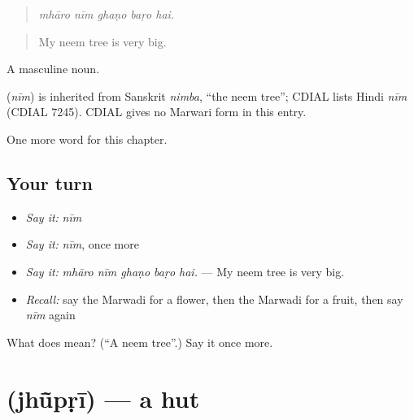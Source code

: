 \begin{quote}
    
\end{quote}

\begin{quote}
\emph{mhāro nīm ghaṇo baṛo hai.}
\end{quote}

\begin{quote}
My neem tree is very big.
\end{quote}

A masculine noun.

\begin{cousinweb}
\textbf{} (\emph{nīm}) is inherited from Sanskrit \emph{nimba}, \textquotedblleft{}the neem tree\textquotedblright{}; CDIAL lists Hindi \emph{nīm} (CDIAL 7245). CDIAL gives no Marwari form in this entry.
\end{cousinweb}

\begin{grammarlens}[title={What you've built}]
One more word for this chapter.
\end{grammarlens}

\subsection*{Your turn}
\begin{itemize}
\raggedright
  \item \emph{Say it:} \emph{nīm}
  \item \emph{Say it:} \emph{nīm}, once more
  \item \emph{Say it:} \emph{mhāro nīm ghaṇo baṛo hai.} — My neem tree is very big.
  \item \emph{Recall:} say the Marwadi for a flower, then the Marwadi for a fruit, then say \emph{nīm} again
\end{itemize}

\begin{tcolorbox}[breakable,colback=teal!4,colframe=teal!35!black,title={Before you move on}]
What does  mean? (\textquotedblleft{}A neem tree\textquotedblright{}.) Say it once more.
\end{tcolorbox}
\section[\texorpdfstring{\mw{झूंपड़ी} (jhū̃pṛī)}{झूंपड़ी (jhū̃pṛī)}]{ (jhū̃pṛī) — a hut}

\label{lesson:MW-C188-jhupri}



